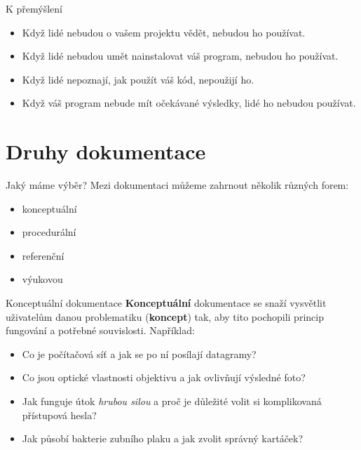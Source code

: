 \documentclass[12pt,a4paper]{beamer}
\begin{document}
		\begin{frame}{K přemýšlení}
			\begin{itemize}
			\item Když lidé nebudou o vašem projektu vědět, nebudou ho používat.
			\item Když lidé nebudou umět nainstalovat váš program, nebudou ho používat.
			\item Když lidé nepoznají, jak použít váš kód, nepoužijí ho.
			\item Když váš program nebude mít očekávané výsledky, lidé ho nebudou používat.
			\end{itemize}
		\end{frame}
	
    
    \section{Druhy dokumentace}
    
    	\begin{frame}{Jaký máme výběr?}
    	Mezi dokumentaci můžeme zahrnout několik různých forem:
    	\begin{itemize}
    		\item konceptuální 
    		\item procedurální 
    		\item referenční
    		\item výukovou
    	\end{itemize}
		\end{frame}
	
		\begin{frame}{Konceptuální dokumentace}
		\textbf{Konceptuální} dokumentace se snaží vysvětlit uživatelům danou problematiku (\textbf{koncept}) tak, aby tito pochopili princip fungování a potřebné souvislosti. Například:
		
		\begin{itemize}
			\item Co je počítačová síť a jak se po ní posílají datagramy?
			\item Co jsou optické vlastnosti objektivu a jak ovlivňují výsledné foto?
			\item Jak funguje útok \textit{hrubou silou} a proč je důležité volit si komplikovaná přístupová hesla?
			\item Jak působí bakterie zubního plaku a jak zvolit správný kartáček?
		\end{itemize}
		\end{frame}
	
\end{document}
